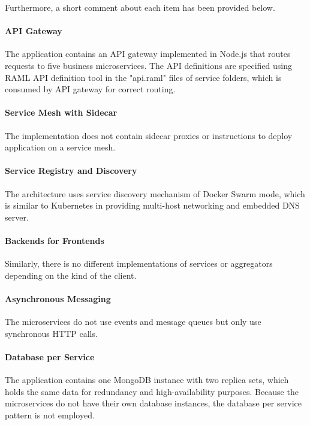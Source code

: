 \documentclass{Configuration_Files/PoliMi3i_thesis}
\begin{document}
Furthermore, a short comment about each item has been provided below.

\paragraph{API Gateway} The application contains an API gateway implemented in Node.js that routes requests to five business microservices.
The API definitions are specified using RAML\footnotemark[101] API definition tool in the "api.raml" files of service folders, which is consumed by API gateway for correct routing.

\paragraph{Service Mesh with Sidecar} The implementation does not contain sidecar proxies or instructions to deploy application on a service mesh.

\paragraph{Service Registry and Discovery} The architecture uses service discovery mechanism of Docker Swarm mode, which is similar to Kubernetes in providing multi-host networking and embedded DNS server.

\paragraph{Backends for Frontends} Similarly, there is no different implementations of services or aggregators depending on the kind of the client.

\paragraph{Asynchronous Messaging} The microservices do not use events and message queues but only use synchronous HTTP calls.

\paragraph{Database per Service} The application contains one MongoDB instance with two replica sets, which holds the same data for redundancy and high-availability purposes.
Because the microservices do not have their own database instances, the database per service pattern is not employed.
\end{document}
